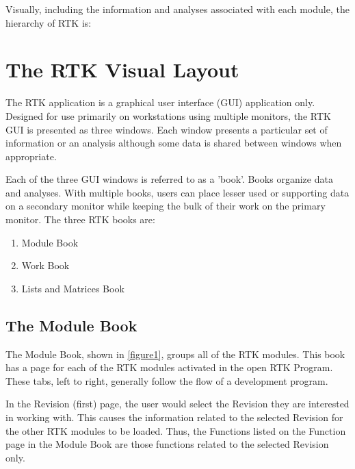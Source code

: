 \documentclass[twoside,12pt,letterpaper,openright]{book}
\begin{document}
\noindent Visually, including the information and analyses associated with each
module, the hierarchy of RTK is:
\\


\section{The RTK Visual Layout}

\noindent The RTK application is a graphical user interface (GUI) application
only.  Designed for use primarily on workstations using multiple monitors, the
RTK GUI is presented as three windows.  Each window presents a particular set
of information or an analysis although some data is shared between windows when
appropriate.

\noindent Each of the three GUI windows is referred to as a 'book'.  Books
organize data and analyses.  With multiple books, users can place lesser used
or supporting data on a secondary monitor while keeping the bulk of their work
on the primary monitor.  The three RTK books are:

\begin{enumerate}
    \item Module Book
    \item Work Book
    \item Lists and Matrices Book
\end{enumerate}

\subsection{The Module Book}

\noindent The Module Book, shown in \ref{figure1}, groups all of the RTK
modules.  This book has a page for each of the RTK modules activated in the
open RTK Program.  These tabs, left to right, generally follow the flow of a
development program.

\noindent In the Revision (first) page, the user would select the Revision
they are interested in working with.  This causes the information related to
the selected Revision for the other RTK modules to be loaded.  Thus, the
Functions listed on the Function page in the Module Book are those functions
related to the selected Revision only.
\end{document}
